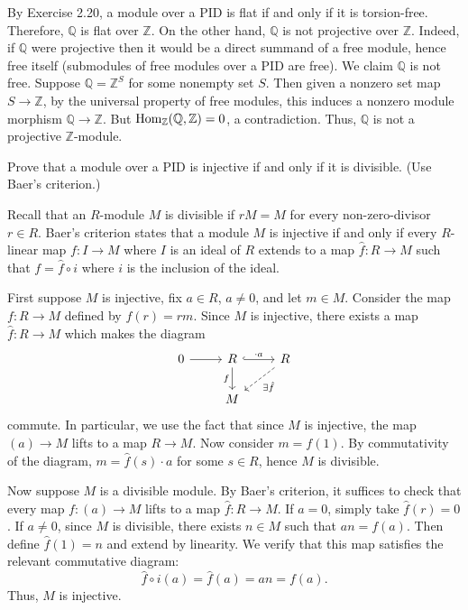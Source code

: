 \documentclass[../../master.tex]{subfiles}
\begin{document}
\begin{solution}
    By Exercise 2.20, a module over a PID is flat if and only if it is torsion-free.
    Therefore, $\mathbb{Q}$ is flat over $\mathbb{Z}$.
    On the other hand, $\mathbb{Q}$ is not projective over $\mathbb{Z}$.
    Indeed, if $\mathbb{Q}$ were projective then it would be a direct summand of a free module, hence free itself (submodules of free modules over a PID are free).
    We claim $\mathbb{Q}$ is not free.
    Suppose $\mathbb{Q} = \mathbb{Z}^{S}$ for some nonempty set $S$.
    Then given a nonzero set map $S \to \mathbb{Z}$, by the universal property of free modules, this induces a nonzero module morphism $\mathbb{Q} \to \mathbb{Z}$.
    But $\operatorname{Hom}_\mathbb{Z}(\mathbb{Q}, \mathbb{Z}) = 0$, a contradiction.
    Thus, $\mathbb{Q}$ is not a projective $\mathbb{Z}$-module.
\end{solution}

\begin{problem}
    Prove that a module over a PID is injective if and only if it is divisible.
    (Use Baer's criterion.)
\end{problem}

\begin{solution}
    Recall that an $R$-module $M$ is divisible if $rM = M$ for every non-zero-divisor $r \in R$.
    Baer's criterion states that a module $M$ is injective if and only if every $R$-linear map $f: I \to M$ where $I$ is an ideal of $R$ extends to a map $\hat{f}:R \to M$ such that $f = \hat{f} \circ i$ where $i$ is the inclusion of the ideal.

    First suppose $M$ is injective, fix $a \in R$, $a \neq 0$, and let $m \in M$. 
    Consider the map $f : R \to M$ defined by $f(r) = rm$.
    Since $M$ is injective, there exists a map $\hat{f} : R \to M$ which makes the diagram
    \[
    \begin{tikzcd}
        0 & R & R \\
          & M
          \arrow[from=1-1, to=1-2]
          \arrow[hook, from=1-2, to=1-3, "\cdot a"]
          \arrow[from=1-2, to=2-2, "f"']
          \arrow[from=1-3, to=2-2, "\exists \hat{f}", dashed] 
    \end{tikzcd}
    \]
    commute.
    In particular, we use the fact that since $M$ is injective, the map $(a) \to M$ lifts to a map $R \to M$.
    Now consider $m = f(1)$.
    By commutativity of the diagram, $m = \hat{f}(s) \cdot a$ for some $s \in R$, hence $M$ is divisible.

    Now suppose $M$ is a divisible module.
    By Baer's criterion, it suffices to check that every map $f: (a) \to M$ lifts to a map $\hat{f} : R \to M$.
    If $a = 0$, simply take $\hat{f}(r) = 0$.
    If $a \neq 0$, since $M$ is divisible, there exists $n \in M$ such that $an = f(a)$.
    Then define $\hat{f}(1) = n$ and extend by linearity.
    We verify that this map satisfies the relevant commutative diagram:
    \[
        \hat{f} \circ i(a) = \hat{f}(a) = an = f(a).
    \]
    Thus, $M$ is injective.
\end{solution}
\end{document}
